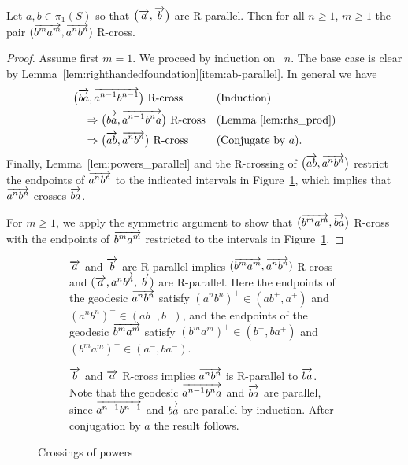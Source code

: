 \begin{lemma}
  Let  $a,b \in \pi_1(S)$ so that $\bigl(\overrightarrow{a},\overrightarrow{b}\bigr)$ are
  R-parallel. Then for all
  $n \ge 1$, $m \geq 1$ the pair $(\overrightarrow{b^ma^m},\overrightarrow{a^n
  b^n})$ R-cross.
\label{lem:anbn_vs_bkak}
\end{lemma}
\begin{proof}
  Assume first $m=1$.
  We proceed by induction on~ $n$.
  The base case
 is clear by
 Lemma~\ref{lem:righthandedfoundation}\ref{item:ab-parallel}. In
 general we have
 \begin{align*}
   &\bigl(\overrightarrow{ba},\overrightarrow{a^{n-1}b^{n-1}}\bigr)\text{ R-cross}
     &&\text{(Induction)}\\
   &\quad\Rightarrow
     \bigl(\overrightarrow{ba},\overrightarrow{a^{n-1}b^n a}\bigr)\text{ R-cross}
     &&\text{(Lemma~\ref{lem:rhs_prod})}\\
   &\quad\Rightarrow
     \bigl(\overrightarrow{ab}, \overrightarrow{a^nb^n}\bigr)\text{ R-cross}
     &&\text{(Conjugate by~$a$)}.
 \end{align*}
Finally,
Lemma~\ref{lem:powers_parallel} and the R-crossing of 
$\bigl(\overrightarrow{ab}, \overrightarrow{a^nb^n}\bigr)$ restrict the
endpoints of $\overrightarrow{a^n b^n}$ to the indicated intervals in
Figure~\ref{fig:parallel_lemma}, which implies that $\overrightarrow{a^n b^n}$ crosses
$\overrightarrow{ba}$.

For $m \geq 1$, we apply the symmetric argument to show that 
$\bigl(\overrightarrow{b^ma^m}, \overrightarrow{ba}\bigr)$ R-cross with the endpoints of $\overrightarrow{b^ma^m}$ restricted to the intervals in Figure~\ref{fig:parallel_lemma}.
\end{proof}
\begin{figure}
     \begin{subfigure}[t]{0.48\textwidth}
\centerline{}
    \caption{$\protect\overrightarrow{a}$ and $\protect\overrightarrow{b}$ are R-parallel
      implies $(\protect\overrightarrow{b^ma^m}, \protect\overrightarrow{a^n b^n})$ R-cross
      and $(\overrightarrow{a},\overrightarrow{a^n b^n}, \overrightarrow{b})$ are R-parallel. Here the endpoints of the geodesic $\protect\overrightarrow{a^nb^n}$ satisfy $(a^nb^n)^+ \in (ab^+, a^+)$ and $(a^nb^n)^- \in (ab^-, b^-)$, and the endpoints of the geodesic $\protect\overrightarrow{b^ma^m}$ satisfy $(b^ma^m)^+ \in (b^+, ba^+)$ and $(b^ma^m)^- \in (a^-, ba^-)$. }
    \label{fig:parallel_lemma}
  \end{subfigure}
  \hfill
    \begin{subfigure}[t]{0.48\textwidth}
 \centerline{}
    \caption{$\protect\overrightarrow{b}$ and $\protect\overrightarrow{a}$ R-cross implies $\protect\overrightarrow{a^n b^n}$ is R-parallel to $\protect\overrightarrow{ba}$. Note that the geodesic $\protect\overrightarrow{a^{n-1}b^na}$ and $\overrightarrow{ba}$ are parallel, since $\protect\overrightarrow{a^{n-1}b^{n-1}}$ and $\protect\overrightarrow{ba}$ are parallel by induction. After conjugation by $a$ the result follows.}
    \label{fig:cross_lemma}
     \end{subfigure}
  \caption{Crossings of powers}
\end{figure}



